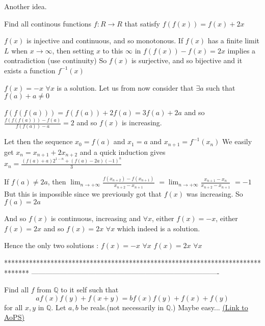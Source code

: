 \begin{solution}
	Another idea.
\end{solution}



\begin{solution}
	\begin{tcolorbox}Find all continous functions $f:R\rightarrow R$  that satisfy
$f(f(x))=f(x)+2x$\end{tcolorbox}
$f(x)$ is injective and continuous, and so monotonous.
If $f(x)$ has a finite limit $L$ when $x\to\infty$, then setting $x$ to this $\infty$ in $f(f(x))-f(x)=2x$ implies a contradiction (use continuity)
So $f(x)$ is surjective, and so bijective and it exists a function $f^{-1}(x)$

$f(x)=-x$ $\forall x$ is a solution.
Let us from now consider that $\exists a$ such that $f(a)+a\ne 0$

$f(f(f(a)))=f(f(a))+2f(a)=3f(a)+2a$ and so $\frac{f(f(f(a)))-f(a)}{f(f(a))-a}=2$ and so $f(x)$ is increasing.

Let then the sequence $x_0=f(a)$ and $x_1=a$ and $x_{n+1}=f^{-1}(x_n)$
We easily get $x_n=x_{n+1}+2x_{n+2}$ and a quick induction gives $x_n=\frac{(f(a)+a)2^{1-n}+(f(a)-2a)(-1)^n}3$

If $f(a)\ne 2a$, then $\lim_{n\to+\infty}\frac {f(x_{n+2})-f(x_{n+1})}{x_{n+2}-x_{n+1}}$ $=\lim_{n\to+\infty}\frac {x_{n+1}-x_n}{x_{n+2}-x_{n+1}}$ $=-1$
But this is impossible since we previously got that $f(x)$ was increasing. So $f(a)=2a$

And so $f(x)$ is continuous, increasing and $\forall x$, either $f(x)=-x$, either $f(x)=2x$ and so $f(x)=2x$ $\forall x$ which indeed is a solution.

Hence the only two solutions :
$f(x)=-x$ $\forall x$
$f(x)=2x$ $\forall x$
\end{solution}
*******************************************************************************
-------------------------------------------------------------------------------

\begin{problem}
	Find all $f$ from $\mathbb{Q}$ to it self such that
\[af(x)f(y)+f(x+y)=bf(x)f(y)+f(x)+f(y)\]
for all $x,y$ in  $\mathbb{Q}$. Let $a,b$ be reals.(not necessarily in $\mathbb{Q}$.)
Maybe easy...
	\flushright \href{https://artofproblemsolving.com/community/c6h464086}{(Link to AoPS)}
\end{problem}



